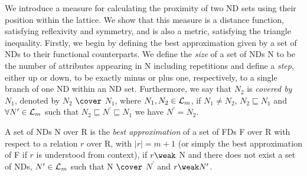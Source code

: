 {\renewcommand{\baselinestretch}{1}
\begin{figure}[ht]
\begin{center}
\end{center}
\end{figure}
}



We introduce a measure for calculating the proximity of two ND sets using
their position within the lattice.  We show that this measure is a distance
function, satisfying reflexivity and symmetry, and is also a metric, 
satisfying the triangle inequality. Firstly, we begin by defining the best
approximation given by a set of NDs to their functional counterparts.
We define the {\em size} of a set of NDs N to be the number of attributes 
appearing in N including repetitions and define a {\em step}, either up
or down, to be exactly minus or plus one, respectively, to a single branch of
one ND within an ND set. Furthermore, we say that $N_2$ is {\em covered by} $N_1$, denoted by $N_2$ $\cover$ $N_1$, where $N_1, N_2 \in {\cal L}_m$, 
if $N_1 \not= N_2$, $N_2 \sqsubseteq N_1$ and
$\forall N^\prime \in {\cal L}_m$ such that 
$N_2 \sqsubseteq N^\prime \sqsubseteq N_1$ we have $N^\prime = N_2$.


\begin{definition}\label{def:best}
\begin{rm}
A set of NDs N over R is the {\em best approximation} of 
a set of FDs F over R with respect to a relation $r$ over R,
with $\mid r \mid = m+1$ (or simply the best approximation of F
if $r$ is understood from context), if $r \weak$ N 
and there does not exist a set of NDs, $N^\prime \in {\cal L}_m$
such that N $\cover$ $N^\prime$ and $r \weak N^\prime$.
\end{rm}
\end{definition}



